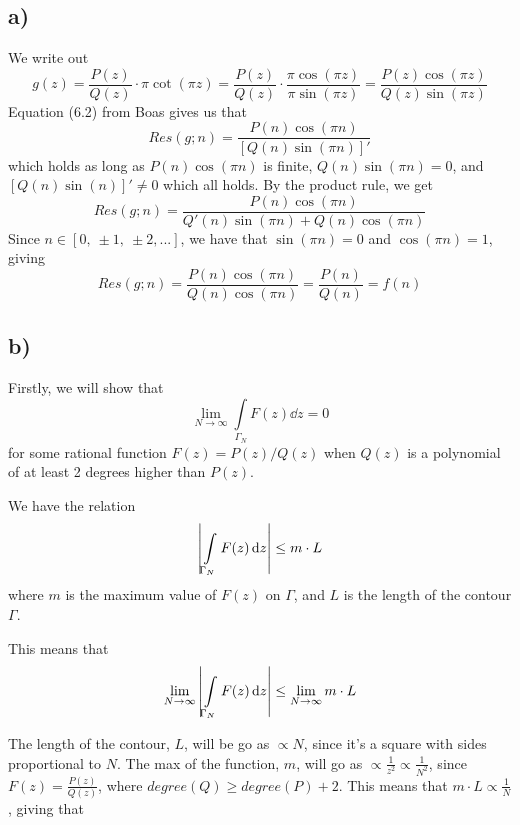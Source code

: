 \documentclass[10pt,a4paper]{article}
\newcommand{\limN}{\lim_{N\rightarrow \infty}}
\newcommand{\Gammaint}{\int\limits_{\Gamma_N}}
\begin{document}
\subsection*{a)}
We write out
\begin{equation}
    g(z) = \frac{P(z)}{Q(z)}\cdot \pi \cot(\pi z) = \frac{P(z)}{Q(z)}\cdot \frac{\pi \cos(\pi z)}{\pi \sin(\pi z)} = \frac{P(z) \cos(\pi z)}{Q(z) \sin(\pi z)}
\end{equation}
Equation (6.2) from Boas gives us that
\begin{equation}
    Res(g;n) = \frac{P(n) \cos(\pi n)}{[Q(n) \sin(\pi n)]'} 
\end{equation}
which holds as long as $P(n)\cos(\pi n)$ is finite, $Q(n)\sin(\pi n) = 0$, and $[Q(n)\sin(n)]' \neq 0$ which all holds. By the product rule, we get
\begin{equation}
    Res(g;n) = \frac{P(n) \cos(\pi n)}{Q'(n) \sin(\pi n) + Q(n) \cos(\pi n)} 
\end{equation}
Since $n\in[0,\ \pm 1,\ \pm 2,...]$, we have that $\sin(\pi n) = 0$ and $\cos(\pi n) = 1$, giving
\begin{equation}
    Res(g;n) = \frac{P(n) \cos(\pi n)}{Q(n) \cos(\pi n)} = \frac{P(n)}{Q(n)} = f(n)
\end{equation}




\subsection*{b)}
Firstly, we will show that
\begin{equation}\label{eqn:task2b}
    \limN \Gammaint F(z) \dd{z} = 0
\end{equation}
for some rational function $F(z) = P(z)/Q(z)$ when $Q(z)$ is a polynomial of at least 2 degrees higher than $P(z)$.

We have the relation
\begin{equation}
    \qty|\Gammaint F(z) \dd{z}| \leq m\cdot L
\end{equation}
where $m$ is the maximum value of $F(z)$ on $\Gamma$, and $L$ is the length of the contour $\Gamma$.

This means that 
\begin{equation}
    \limN \qty|\Gammaint F(z) \dd{z}| \leq \limN m\cdot L
\end{equation}

The length of the contour, $L$, will be go as $\propto N$, since it's a square with sides proportional to $N$. The max of the function, $m$, will go as $\propto\frac{1}{z^2} \propto \frac{1}{N^2}$, since $F(z) = \frac{P(z)}{Q(z)}$, where $degree(Q) \geq degree(P) + 2$. This means that $m\cdot L \propto \frac{1}{N}$, giving that
\end{document}
